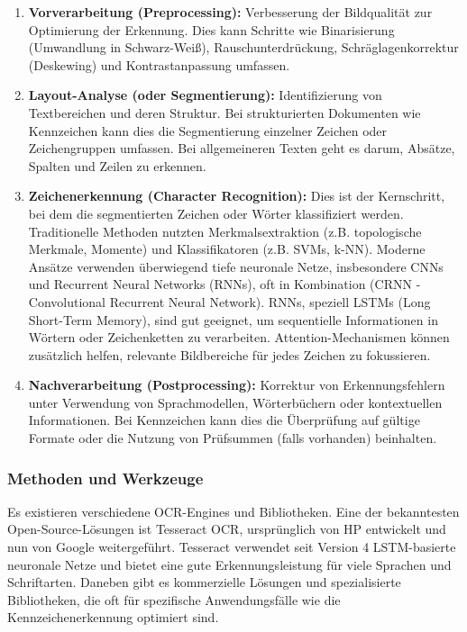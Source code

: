 \begin{enumerate}
    \item \textbf{Vorverarbeitung (Preprocessing):} Verbesserung der Bildqualität zur Optimierung der Erkennung. Dies kann Schritte wie Binarisierung (Umwandlung in Schwarz-Weiß), Rauschunterdrückung, Schräglagenkorrektur (Deskewing) und Kontrastanpassung umfassen.

    \item \textbf{Layout-Analyse (oder Segmentierung):} Identifizierung von Textbereichen und deren Struktur. Bei strukturierten Dokumenten wie Kennzeichen kann dies die Segmentierung einzelner Zeichen oder Zeichengruppen umfassen. Bei allgemeineren Texten geht es darum, Absätze, Spalten und Zeilen zu erkennen.

    \item \textbf{Zeichenerkennung (Character Recognition):} Dies ist der Kernschritt, bei dem die segmentierten Zeichen oder Wörter klassifiziert werden. Traditionelle Methoden nutzten Merkmalsextraktion (z.B. topologische Merkmale, Momente) und Klassifikatoren (z.B. SVMs, k-NN). Moderne Ansätze verwenden überwiegend tiefe neuronale Netze, insbesondere CNNs und Recurrent Neural Networks (RNNs), oft in Kombination (CRNN - Convolutional Recurrent Neural Network). RNNs, speziell LSTMs (Long Short-Term Memory), sind gut geeignet, um sequentielle Informationen in Wörtern oder Zeichenketten zu verarbeiten. Attention-Mechanismen können zusätzlich helfen, relevante Bildbereiche für jedes Zeichen zu fokussieren.

    \item \textbf{Nachverarbeitung (Postprocessing):} Korrektur von Erkennungsfehlern unter Verwendung von Sprachmodellen, Wörterbüchern oder kontextuellen Informationen. Bei Kennzeichen kann dies die Überprüfung auf gültige Formate oder die Nutzung von Prüfsummen (falls vorhanden) beinhalten.
\end{enumerate}

\subsubsection{Methoden und Werkzeuge}
Es existieren verschiedene OCR-Engines und Bibliotheken. Eine der bekanntesten Open-Source-Lösungen ist Tesseract OCR, ursprünglich von HP entwickelt und nun von Google weitergeführt. Tesseract verwendet seit Version 4 LSTM-basierte neuronale Netze und bietet eine gute Erkennungsleistung für viele Sprachen und Schriftarten. Daneben gibt es kommerzielle Lösungen und spezialisierte Bibliotheken, die oft für spezifische Anwendungsfälle wie die Kennzeichenerkennung optimiert sind.

